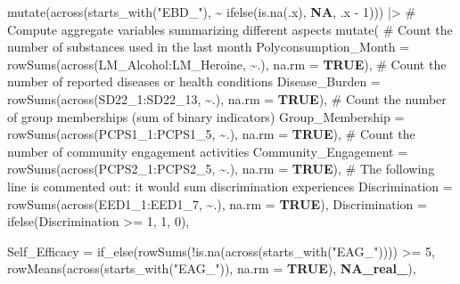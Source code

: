 \documentclass[
  bookmarksnumbered]{article}
\newenvironment{Shaded}{\begin{snugshade}}{\end{snugshade}}
\newcommand{\AttributeTok}[1]{\textcolor[rgb]{0.80,0.80,0.80}{#1}}
\newcommand{\CommentTok}[1]{\textcolor[rgb]{0.50,0.62,0.50}{#1}}
\newcommand{\ConstantTok}[1]{\textcolor[rgb]{0.86,0.64,0.64}{\textbf{#1}}}
\newcommand{\DecValTok}[1]{\textcolor[rgb]{0.86,0.86,0.80}{#1}}
\newcommand{\FunctionTok}[1]{\textcolor[rgb]{0.94,0.94,0.56}{#1}}
\newcommand{\NormalTok}[1]{\textcolor[rgb]{0.80,0.80,0.80}{#1}}
\newcommand{\SpecialCharTok}[1]{\textcolor[rgb]{0.86,0.64,0.64}{#1}}
\newcommand{\StringTok}[1]{\textcolor[rgb]{0.80,0.58,0.58}{#1}}
\begin{document}
\begin{Shaded}
\begin{Highlighting}[]
  \FunctionTok{mutate}\NormalTok{(}\FunctionTok{across}\NormalTok{(}\FunctionTok{starts\_with}\NormalTok{(}\StringTok{"EBD\_"}\NormalTok{), }\SpecialCharTok{\textasciitilde{}} \FunctionTok{ifelse}\NormalTok{(}\FunctionTok{is.na}\NormalTok{(.x), }\ConstantTok{NA}\NormalTok{, .x }\SpecialCharTok{{-}} \DecValTok{1}\NormalTok{))) }\SpecialCharTok{|\textgreater{}} 
  \CommentTok{\# Compute aggregate variables summarizing different aspects}
  \FunctionTok{mutate}\NormalTok{(}
    \CommentTok{\# Count the number of substances used in the last month}
    \AttributeTok{Polyconsumption\_Month =} \FunctionTok{rowSums}\NormalTok{(}\FunctionTok{across}\NormalTok{(LM\_Alcohol}\SpecialCharTok{:}\NormalTok{LM\_Heroine, }\SpecialCharTok{\textasciitilde{}}\NormalTok{.), }\AttributeTok{na.rm =} \ConstantTok{TRUE}\NormalTok{),}
    \CommentTok{\# Count the number of reported diseases or health conditions}
    \AttributeTok{Disease\_Burden =} \FunctionTok{rowSums}\NormalTok{(}\FunctionTok{across}\NormalTok{(SD22\_1}\SpecialCharTok{:}\NormalTok{SD22\_13, }\SpecialCharTok{\textasciitilde{}}\NormalTok{.), }\AttributeTok{na.rm =} \ConstantTok{TRUE}\NormalTok{),}
    \CommentTok{\# Count the number of group memberships (sum of binary indicators)}
    \AttributeTok{Group\_Membership =} \FunctionTok{rowSums}\NormalTok{(}\FunctionTok{across}\NormalTok{(PCPS1\_1}\SpecialCharTok{:}\NormalTok{PCPS1\_5, }\SpecialCharTok{\textasciitilde{}}\NormalTok{.), }\AttributeTok{na.rm =} \ConstantTok{TRUE}\NormalTok{),}
    \CommentTok{\# Count the number of community engagement activities}
    \AttributeTok{Community\_Engagement =} \FunctionTok{rowSums}\NormalTok{(}\FunctionTok{across}\NormalTok{(PCPS2\_1}\SpecialCharTok{:}\NormalTok{PCPS2\_5, }\SpecialCharTok{\textasciitilde{}}\NormalTok{.), }\AttributeTok{na.rm =} \ConstantTok{TRUE}\NormalTok{),}
    \CommentTok{\# The following line is commented out: it would sum discrimination experiences}
    \AttributeTok{Discrimination =} \FunctionTok{rowSums}\NormalTok{(}\FunctionTok{across}\NormalTok{(EED1\_1}\SpecialCharTok{:}\NormalTok{EED1\_7, }\SpecialCharTok{\textasciitilde{}}\NormalTok{.), }\AttributeTok{na.rm =} \ConstantTok{TRUE}\NormalTok{),}
    \AttributeTok{Discrimination =} \FunctionTok{ifelse}\NormalTok{(Discrimination }\SpecialCharTok{\textgreater{}=} \DecValTok{1}\NormalTok{, }\DecValTok{1}\NormalTok{, }\DecValTok{0}\NormalTok{),}
    
    \AttributeTok{Self\_Efficacy =} \FunctionTok{if\_else}\NormalTok{(}\FunctionTok{rowSums}\NormalTok{(}\SpecialCharTok{!}\FunctionTok{is.na}\NormalTok{(}\FunctionTok{across}\NormalTok{(}\FunctionTok{starts\_with}\NormalTok{(}\StringTok{"EAG\_"}\NormalTok{)))) }\SpecialCharTok{\textgreater{}=} \DecValTok{5}\NormalTok{,}
                            \FunctionTok{rowMeans}\NormalTok{(}\FunctionTok{across}\NormalTok{(}\FunctionTok{starts\_with}\NormalTok{(}\StringTok{"EAG\_"}\NormalTok{)), }\AttributeTok{na.rm =} \ConstantTok{TRUE}\NormalTok{),}
                            \ConstantTok{NA\_real\_}\NormalTok{),}
    

\end{Highlighting}
\end{Shaded}
\end{document}
